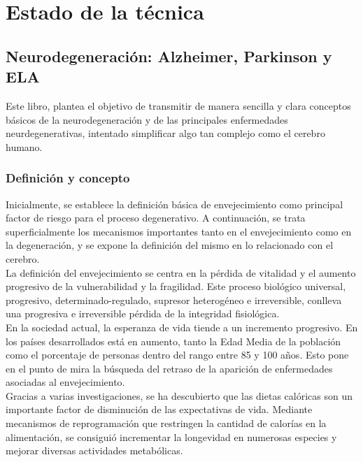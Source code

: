 \chapter{Estado de la técnica}

\section{Neurodegeneración: Alzheimer, Parkinson y ELA}

Este libro, plantea el objetivo de transmitir de manera sencilla y clara conceptos básicos de la neurodegeneración y de las principales enfermedades neurdegenerativas, intentado simplificar algo tan complejo como el cerebro humano. \cite{Neurodeg64}

\subsection{Definición y concepto}

Inicialmente, se establece la definición básica de envejecimiento como principal factor de riesgo para el proceso degenerativo. A continuación, se trata superficialmente los mecanismos importantes tanto en el envejecimiento como en la degeneración, y se expone la definición del mismo en lo relacionado con el cerebro.\\

La definición del envejecimiento se centra en la pérdida de vitalidad y el aumento progresivo de la vulnerabilidad y la fragilidad.  Este proceso biológico universal, progresivo, determinado-regulado, supresor heterogéneo e irreversible, conlleva una progresiva e irreversible pérdida de la integridad fisiológica.\\

En la sociedad actual, la esperanza de vida tiende a un incremento progresivo. En los países desarrollados está en aumento, tanto la Edad Media de la población como el porcentaje de personas dentro del rango entre 85 y 100 años. Esto pone en el punto de mira la búsqueda del retraso de la aparición de enfermedades asociadas al envejecimiento.\\

Gracias a varias investigaciones, se ha descubierto que las dietas calóricas son un importante factor de disminución de las expectativas de vida. Mediante mecanismos de reprogramación que restringen la cantidad de calorías en la alimentación, se consiguió incrementar la longevidad en numerosas especies y mejorar diversas actividades metabólicas. \\

